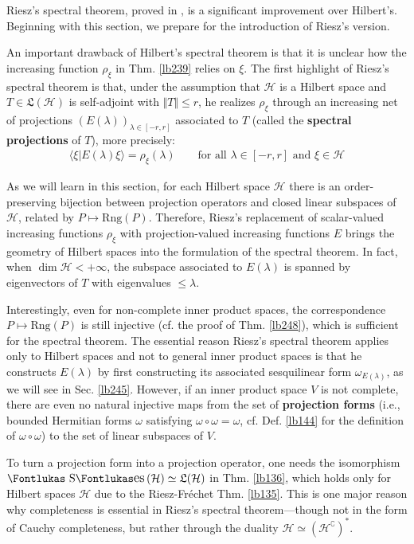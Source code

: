 \documentclass[12pt,b5paper,notitlepage]{article}
\theoremstyle{definition}
\theoremstyle{plain}
\DeclareMathOperator{\Ses}{\text{\Fontlukas S}\text{\kern -0pt {\Fontlukas\large es}}\,}
\newcommand{\fk}{\mathfrak}
\newcommand{\bk}[1]{\langle {#1}\rangle}
\newcommand{\Co}{\complement}
\newcommand{\Rng}{\mathrm{Rng}}
\newcommand{\MH}{\mathcal H}
\numberwithin{equation}{section}
\begin{document}
Riesz's spectral theorem, proved in \cite[Ch. V]{Rie13}, is a significant improvement over Hilbert's. Beginning with this section, we prepare for the introduction of Riesz's version.

An important drawback of Hilbert's spectral theorem is that it is unclear how the increasing function $\rho_\xi$ in Thm. \ref{lb239} relies on $\xi$. The first highlight of Riesz's spectral theorem is that, under the assumption that $\MH$ is a Hilbert space and $T\in\fk L(\MH)$ is self-adjoint with $\Vert T\Vert\leq r$, he realizes $\rho_\xi$ through an increasing net of projections $(E(\lambda))_{\lambda\in[-r,r]}$ associated to $T$ (called the \textbf{spectral projections} of $T$), more precisely:
\begin{align*}
\bk{\xi|E(\lambda)\xi}=\rho_\xi(\lambda)\qquad\text{for all }\lambda\in[-r,r]\text{ and }\xi\in\MH
\end{align*}

As we will learn in this section, for each Hilbert space $\MH$ there is an order-preserving bijection between projection operators and closed linear subspaces of $\MH$, related by $P\mapsto \Rng(P)$. Therefore, Riesz's replacement of scalar-valued increasing functions $\rho_\xi$ with projection-valued increasing functions $E$ brings the geometry of Hilbert spaces into the formulation of the spectral theorem. In fact, when $\dim \MH<+\infty$, the subspace associated to $E(\lambda)$ is spanned by eigenvectors of $T$ with eigenvalues $\leq\lambda$.


Interestingly, even for non-complete inner product spaces, the correspondence $P\mapsto\Rng(P)$ is still injective (cf. the proof of Thm. \ref{lb248}), which is sufficient for the spectral theorem. The essential reason Riesz's spectral theorem applies only to Hilbert spaces and not to general inner product spaces is that he constructs $E(\lambda)$ by first constructing its associated sesquilinear form $\omega_{E(\lambda)}$, as we will see in Sec. \ref{lb245}. However, if an inner product space $V$ is not complete, there are even no natural injective maps from the set of \textbf{projection forms}  (i.e., bounded Hermitian forms $\omega$ satisfying $\omega\circ\omega=\omega$, cf. Def. \ref{lb144} for the definition of $\omega\circ\omega$) to the set of linear subspaces of $V$. 

To turn a projection form into a projection operator, one needs the isomorphism $\Ses(\MH)\simeq\fk L(\MH)$ in Thm. \ref{lb136}, which holds only for Hilbert spaces $\MH$ due to the Riesz-Fr\'echet Thm. \ref{lb135}. This is one major reason why completeness is essential in Riesz's spectral theorem---though not in the form of Cauchy completeness, but rather through the duality $\MH\simeq(\MH^\Co)^*$. 
\end{document}
